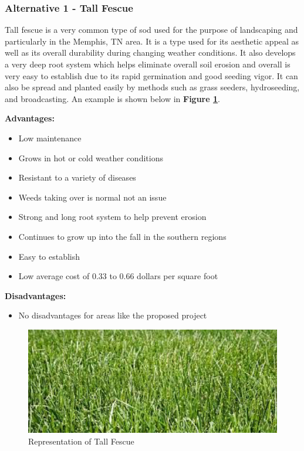 \documentclass{ceri}
\begin{document}
\subsubsection{Alternative 1 - Tall Fescue}
Tall fescue is a very common type of sod used for the purpose of landscaping and particularly in the Memphis, TN area. It is a type used for its aesthetic appeal as well as its overall durability during changing weather conditions. It also develops a very deep root system which helps eliminate overall soil erosion and overall is very easy to establish due to its rapid germination and good seeding vigor. It can also be spread and planted easily by methods such as grass seeders, hydroseeding, and broadcasting. An example is shown below in \textbf{Figure \ref{fig:AutinX}}.

	\textbf{Advantages:}
\begin{itemize}
\item  Low maintenance
\end{itemize}
\begin{itemize}
\item  Grows in hot or cold weather conditions
\item  Resistant to a variety of diseases
\item  Weeds taking over is normal not an issue
\item  Strong and long root system to help prevent erosion
\item  Continues to grow up into the fall in the southern regions
\item  Easy to establish 
\item  Low average cost of 0.33 to 0.66 dollars per square foot 
\end{itemize}

	\textbf{Disadvantages:}
\begin{itemize}
\item  No disadvantages for areas like the proposed project
\end{itemize}

\begin{figure}[H]
    \centering
    \includegraphics[width=.4\textwidth]{images/Austin-X.png}
    \caption{Representation of Tall Fescue}
    \label{fig:AutinX}
\end{figure}
\end{document}
